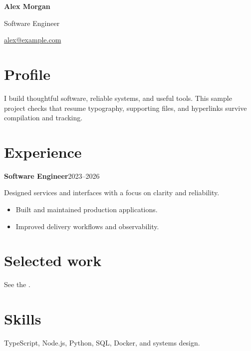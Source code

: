 \documentclass[11pt,a4paper]{article}
\begin{document}
{\Huge\bfseries Alex Morgan}\par\vspace{5mm}
{\large Software Engineer}\par\vspace{7mm}
\quad
{}\quad
\href{mailto:alex@example.com}{alex@example.com}
\section*{Profile}
I build thoughtful software, reliable systems, and useful tools. This sample
project checks that resume typography, supporting files, and hyperlinks survive
compilation and tracking.
\section*{Experience}
\textbf{Software Engineer}\hfill 2023--2026\par
Designed services and interfaces with a focus on clarity and reliability.
\begin{itemize}
\item Built and maintained production applications.
\item Improved delivery workflows and observability.
\end{itemize}
\section*{Selected work}
See the .
\section*{Skills}
TypeScript, Node.js, Python, SQL, Docker, and systems design.
\end{document}

